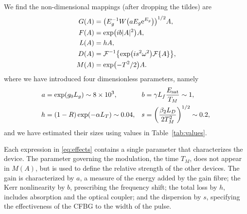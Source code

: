 \documentclass[9pt,twocolumn,twoside]{osajnl}
\let\originalleft\left
\let\originalright\right
\renewcommand{\left}{\mathopen{}\mathclose\bgroup\originalleft}
\renewcommand{\right}{\aftergroup\egroup\originalright}
\newcommand{\Es}{E_{\textrm{sat}}} %
\newcommand{\FT}[1]{\mathcal{F}\left\{ #1 \right\}} %
\newcommand{\FTi}[1]{\mathcal{F}^{-1}\left\{ #1 \right\}} %
\begin{document}
We find the non-dimensional mappings (after dropping the tildes) are
\begin{equation}
	\begin{aligned}
		G(A) &= \left(E_g^{-1} W \left( a E_g \textrm{e}^{E_g}\right) \right)^{1/2} A,\\
		F(A) &= \exp \left( i b |A|^2 \right) A, \\
		L(A) &= h A, \\
		D(A) &= \FTi{\exp \left( i s^2 \omega^2 \right) \FT{A}}, \\
		M(A) &= \exp \left( -T^2 / 2 \right) A.
	\end{aligned}
	\label{eq:effects}
\end{equation}
where we have introduced four dimensionless parameters, namely
\begin{equation}
	\hspace*{-1mm}
	\begin{aligned}
		a &= \exp( g_0 L_g ) \sim 8 \times 10^3, & 
		b &= \gamma L_f \frac{\Es}{T_M} \sim 1, \\
		h &= (1 - R) \exp( - \alpha L_T) \sim 0.04, &
		s &= \left( \frac{\beta_2 L_D}{2 T_M^2} \right)^{1/2} \sim 0.2,	
	\end{aligned}
	\label{eq:ndparam}
\end{equation}
and we have estimated their sizes using values in Table~\ref{tab:values}.

Each expression in \eqref{eq:effects} contains a single parameter that characterizes the device. The parameter governing the modulation, the time $T_M$, does not appear in $M(A)$, but is used to define the relative strength of the other devices. The gain is characterized by $a$, a measure of the energy added by the gain fibre; the Kerr nonlinearity by $b$, prescribing the frequency shift; the total loss by $h$, includes absorption and the optical coupler; and the dispersion by $s$, specifying the effectiveness of the CFBG to the width of the pulse.
\end{document}
